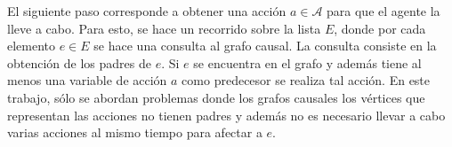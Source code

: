 El siguiente paso corresponde a obtener una acción $a \in \mathcal{A}$ para que el agente la lleve a cabo.
Para esto, se hace un recorrido sobre la lista $E$, donde
por cada elemento $e \in E$ se hace una consulta al grafo causal. La consulta consiste en la
obtención de los padres de $e$.  Si $e$ se encuentra en el grafo y además tiene al menos una variable de acción $a$ como predecesor se realiza tal acción.
En este trabajo, sólo se abordan problemas donde los grafos causales los vértices que representan las acciones no tienen padres y además no es necesario llevar a cabo varias acciones al mismo tiempo para afectar a $e$.




